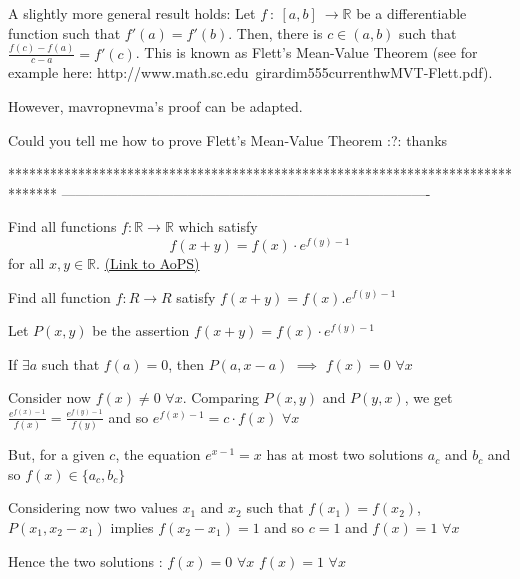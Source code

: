 \begin{solution}
	\begin{tcolorbox}A slightly more general result holds: Let $ f\ : \ [a,b]\ \rightarrow \mathbb{R}$ be a differentiable function such that $ f'(a) = f'(b)$. Then, there is $ c \in (a,b)$ such that $ \frac {f(c) - f(a)}{c - a} = f'(c)$. This is known as Flett's Mean-Value Theorem (see for example here: http://www.math.sc.edu\/~girardi\/m555\/current\/hw\/MVT-Flett.pdf).

However, mavropnevma's proof can be adapted.\end{tcolorbox}

Could you tell me how to prove Flett's Mean-Value Theorem  :?: thanks
\end{solution}
*******************************************************************************
-------------------------------------------------------------------------------

\begin{problem}
	Find all functions $f: \mathbb R \to \mathbb R$ which satisfy \[ f(x+y)=f(x) \cdot e^{f(y)-1}\] for all $x,y \in \mathbb R$.
	\flushright \href{https://artofproblemsolving.com/community/c6h304546}{(Link to AoPS)}
\end{problem}



\begin{solution}
	\begin{tcolorbox}Find all function $ f: R\to R$ satisfy $ f(x + y) = f(x).e^{f(y) - 1}$\end{tcolorbox}

Let $ P(x,y)$ be the assertion $ f(x+y)=f(x)\cdot e^{f(y)-1}$

If $ \exists a$ such that $ f(a)=0$, then $ P(a,x-a)$ $ \implies$ $ f(x)=0$ $ \forall x$

Consider now $ f(x)\neq 0$ $ \forall x$. Comparing $ P(x,y)$ and $ P(y,x)$, we get $ \frac{e^{f(x)-1}}{f(x)}=\frac{e^{f(y)-1}}{f(y)}$ and so $ e^{f(x)-1}=c\cdot f(x)$ $ \forall x$

But, for a given $ c$, the equation $ e^{x-1}=x$ has at most two solutions $ a_c$ and $ b_c$ and so  $ f(x)\in\{a_c,b_c\}$

Considering now two values $ x_1$ and $ x_2$ such that $ f(x_1)=f(x_2)$, $ P(x_1,x_2-x_1)$ implies $ f(x_2-x_1)=1$ and so $ c=1$ and $ f(x)=1$ $ \forall x$

Hence the two solutions :
$ f(x)=0$ $ \forall x$
$ f(x)=1$ $ \forall x$
\end{solution}



